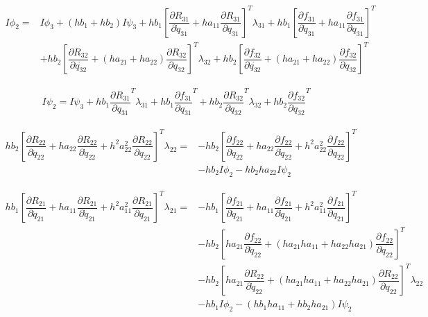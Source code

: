 \documentclass[10pt,letter]{book}
\newcommand{\pd}[2]{\dfrac{\partial #1}{\partial #2}}
\begin{document}
     \begin{equation}
       \begin{split}
         I \phi_2 = & I \phi_3 + (hb_1 + hb_2) I \psi_3  + hb_1 \left[ \pd{R_{31}}{\dot{q}_{31}} + ha_{11} \pd{R_{31}}{q_{31}}  \right]^T \lambda_{31} + hb_1 \left[ \pd{f_{31}}{\dot{q}_{31}} + ha_{11} \pd{f_{31}}{{q}_{31}} \right]^T \\
         & + hb_2 \left[ \pd{R_{32}}{\dot{q_{32}}} + (ha_{21} + ha_{22}) \pd{R_{32}}{q_{32}} \right]^T \lambda_{32} + hb_2 \left[ \pd{f_{32}}{\dot{q_{32}}} + (ha_{21} + ha_{22}) \pd{f_{32}}{q_{32}} \right]^T               
       \end{split}
     \end{equation}

     \begin{equation}
       \begin{split}
         I \psi_2 = I \psi_3 + hb_1 \pd{R_{31}}{q_{31}}^T \lambda_{31} + hb_1 \pd{f_{31}}{q_{31}}^T  + hb_2 \pd{R_{32}}{q_{32}}^T \lambda_{32} + hb_2 \pd{f_{32}}{q_{32}}^T
       \end{split}
     \end{equation}


     \begin{equation}
       \begin{split}
         hb_2\left[\pd{R_{22}}{\ddot{q}_{22}} + ha_{22}\pd{R_{22}}{\dot{q}_{22}} + h^2a_{22}^2 \pd{R_{22}}{{q}_{22}} \right]^T \lambda_{22} = & - hb_2 \left[\pd{f_{22}}{\ddot{q}_{22}} + ha_{22}\pd{f_{22}}{\dot{q}_{22}} + h^2a_{22}^2 \pd{f_{22}}{{q}_{22}} \right]^T \\ 
         & - hb_2 I \phi_2 - hb_2 ha_{22} I  \psi_2
       \end{split}
     \end{equation}

     \begin{equation}
       \begin{split}
         hb_1\left[\pd{R_{21}}{\ddot{q}_{21}} + ha_{11}\pd{R_{21}}{\dot{q}_{21}} + h^2a_{11}^2 \pd{R_{21}}{{q}_{21}} \right]^T \lambda_{21} = & - hb_1 \left[\pd{f_{21}}{\ddot{q}_{21}} + ha_{11}\pd{f_{21}}{\dot{q}_{21}} + h^2a_{11}^2 \pd{f_{21}}{{q}_{21}} \right]^T \\ 
         & - hb_2 \left[ha_{21}\pd{f_{22}}{\dot{q}_{22}} + (ha_{21}ha_{11} + ha_{22}ha_{21}) \pd{f_{22}}{{q}_{22}} \right]^T \\
         & - hb_2 \left[ha_{21}\pd{R_{22}}{\dot{q}_{22}} + (ha_{21}ha_{11} + ha_{22}ha_{21}) \pd{R_{22}}{{q}_{22}} \right]^T\lambda_{22} \\
         & - hb_1I \phi_2  - (hb_1ha_{11} + hb_2ha_{21}) I \psi_2
       \end{split}
     \end{equation}
\end{document}
